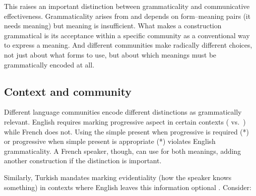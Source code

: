 \ea \label{ex:meaning-without-grammar}
\z\z
This raises an important distinction between grammaticality and communicative effectiveness. Grammaticality arises from and depends on form--meaning pairs (it needs meaning) but meaning is insufficient. What makes a construction grammatical is its acceptance within a specific community as a conventional way to express a meaning. And different communities make radically different choices, not just about what forms to use, but about which meanings must be grammatically encoded at all.

\subsection{Context and community}

Different language communities encode different distinctions as grammatically relevant. English requires marking progressive aspect in certain contexts ( vs.\ ) while French does not. Using the simple present when progressive is required (*) or progressive when simple present is appropriate (*) violates English grammaticality. A French speaker, though, can use  for both meanings, adding another construction if the distinction is important.

Similarly, Turkish mandates marking evidentiality (how the speaker knows something) in contexts where English leaves this information optional \citep[see][]{GokselKerslake2005}. Consider:

